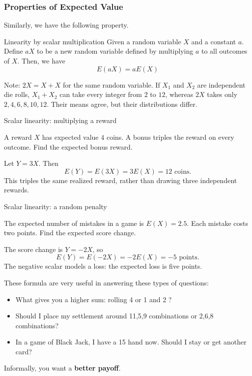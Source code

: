 \begin{frame}
\frametitle{Properties of Expected Value}
Similarly, we have the following property.
\begin{thm}{Linearity by scalar multiplication}{}
Given a random variable $X$ and a constant $a$. Define $aX$ to be a new random variable defined by multiplying $a$ to all outcomes of $X$. Then, we have
\[E(aX) = aE(X)\]
\end{thm}
Note: $2X=X+X$ for the same random variable. If $X_1$ and $X_2$ are independent die rolls, $X_1+X_2$ can take every integer from $2$ to $12$, whereas $2X$ takes only $2,4,6,8,10,12$. Their means agree, but their distributions differ.
\end{frame}
\begin{frame}[t]{Scalar linearity: multiplying a reward}
\small
\begin{ex}
A reward $X$ has expected value $4$ coins. A bonus triples the reward on every outcome. Find the expected bonus reward.
\end{ex}
\begin{sol}
Let $Y=3X$. Then\[E(Y)=E(3X)=3E(X)=12\text{ coins}.\] This triples the same realized reward, rather than drawing three independent rewards.
\end{sol}
\end{frame}

\begin{frame}[t]{Scalar linearity: a random penalty}
\small
\begin{ex}
The expected number of mistakes in a game is $E(X)=2.5$. Each mistake costs two points. Find the expected score change.
\end{ex}
\begin{sol}
The score change is $Y=-2X$, so\[E(Y)=E(-2X)=-2E(X)=-5\text{ points}.\] The negative scalar models a loss: the expected loss is five points.
\end{sol}
\end{frame}


\begin{frame}
These formula are very useful in answering these types of questions: \pa
\begin{itemize}
\item What gives you a higher sum: rolling 4  or 1  and 2 ? \pa
\item Should I place my settlement around 11,5,9 combinations or 2,6,8 combinations? \pa
\item In a game of Black Jack, I have a 15 hand now. Should I stay or get another card? \pa
\end{itemize}
Informally, you want a \textbf{better payoff}.
\end{frame}


